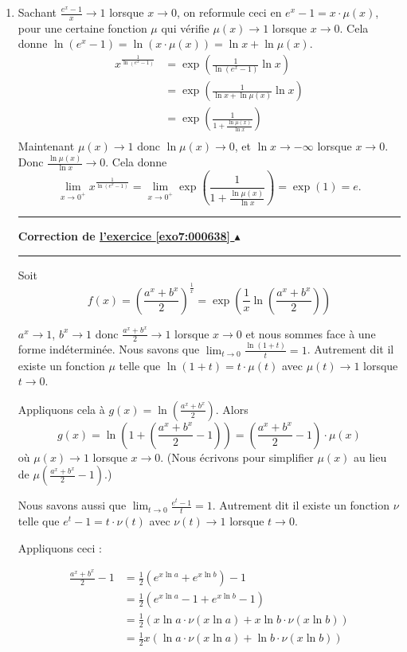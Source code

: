 \documentclass[11pt,a4paper]{article}
\newcounter{exo}
\newcommand{\correction}[1]{\hypertarget{cor7:#1}{}\label{cor7:#1}{\bf Correction de \hyperlink{exo7:#1}{l'exercice \ref{exo7:#1} $\blacktriangle$}}\vspace{1mm}\hrule\vspace{1mm}}
\newcommand{\fincorrection}{\vspace{1mm}\hrule\vspace*{7mm}}
\begin{document}
\begin{enumerate}
 \item Sachant $\frac{e^x - 1}{x} \to 1$ lorsque $x\to 0$, on reformule ceci
en $e^x-1 = x \cdot \mu(x)$, pour une certaine fonction $\mu$ qui vérifie $\mu(x) \to 1$ lorsque $x\to 0$.
Cela donne $\ln (e^x-1) = \ln (x \cdot \mu(x)) = \ln x + \ln \mu(x).$
\begin{align*}
 x^{\frac{1}{\ln (e^{x}-1)}} 
  &= \exp\left( \frac{1}{\ln (e^{x}-1)} \ln x  \right) \\
  &= \exp\left( \frac{1}{\ln x + \ln \mu(x)} \ln x  \right) \\
  &= \exp\left( \frac{1}{1 + \frac{\ln \mu(x)}{\ln x}} \right) \\
\end{align*}
Maintenant $\mu(x) \to 1$ donc $\ln \mu(x) \to 0$, et $\ln x \to - \infty$ lorsque $x \to 0$.
Donc $\frac{\ln \mu(x)}{\ln x} \to 0$.
Cela donne 
$$\lim\limits_{x\rightarrow 0^{+}}x^{\frac{1}{\ln (e^{x}-1)}} = \lim\limits_{x\rightarrow 0^{+}} \exp\left( \frac{1}{1 + \frac{\ln \mu(x)}{\ln x}} \right) = \exp\left(1\right) = e.$$

\fincorrection
\correction{000638}

Soit 
$$
 f(x) = \left(\frac{a^{x}+b^{x}}{2}\right)^{\frac{1}{x}}
     = \exp\left( \frac 1x \ln \left(\frac{a^{x}+b^{x}}{2}\right) \right) 
$$

$a^x \to 1$, $b^x \to 1$ donc $\frac{a^{x}+b^{x}}{2} \to 1$ lorsque $x \to 0$
et nous sommes face à une forme indéterminée.
Nous savons que $\lim_{t \to 0} \frac{\ln(1+t)}{t} = 1$.
Autrement dit il existe un fonction $\mu$ telle que $\ln(1+t) = t \cdot \mu(t)$ avec
$\mu(t) \to 1$ lorsque $t\to 0$.

Appliquons cela à $g(x) = \ln \left(\frac{a^{x}+b^{x}}{2}\right)$.
Alors 
$$g(x) = \ln \left(1+ \left(\frac{a^{x}+b^{x}}{2}-1\right)\right) =  \left(\frac{a^{x}+b^{x}}{2}-1\right) \cdot \mu(x)$$
o\` u $\mu(x) \to 1$ lorsque $x\to 0$. (Nous écrivons pour simplifier $\mu(x)$ au lieu
de $\mu(\frac{a^{x}+b^{x}}{2}-1)$.)



\bigskip

Nous savons aussi que $\lim_{t \to 0} \frac{e^t - 1}{t} = 1$.
Autrement dit il existe un fonction $\nu$ telle que $e^t - 1 = t \cdot \nu(t)$ avec
$\nu(t) \to 1$ lorsque $t\to 0$.

Appliquons ceci :

\begin{align*}
 \frac{a^{x}+b^{x}}{2}-1 
     &= \frac 12 (e^{x \ln a} + e^{x\ln b})-1 \\
     &= \frac12 (e^{x \ln a}-1 + e^{x\ln b}-1) \\
     &= \frac12( x \ln a \cdot \nu(x \ln a) + x \ln b \cdot \nu(x \ln b)) \\
     &= \frac12 x\left(\ln a \cdot \nu(x \ln a) +  \ln b \cdot \nu(x \ln b) \right) \\
\end{align*}


\end{enumerate}
\end{document}
